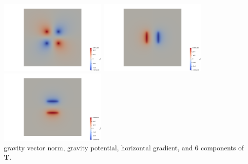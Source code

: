 \begin{center}
\includegraphics[width=5.3cm]{python_codes/fieldstone_84/arct15/Txy}
\includegraphics[width=5.3cm]{python_codes/fieldstone_84/arct15/Txz}
\includegraphics[width=5.3cm]{python_codes/fieldstone_84/arct15/Tyz}\\
{\captionfont gravity vector norm, gravity potential, horizontal gradient,
and 6 components of ${\bm T}$.}
\end{center}


